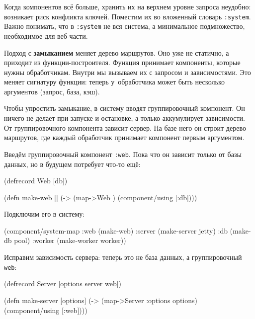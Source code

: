 Когда компонентов всё больше, хранить их на верхнем уровне запроса неудобно:
возникает риск конфликта ключей. Поместим их во вложенный словарь
\verb|:system|. Важно понимать, что в \verb|:system| не вся система, а
минимальное подмножество, необходимое для веб-части.


Подход с \textbf{замыканием} меняет дерево маршрутов. Оно уже не статично, а
приходит из функции-построителя. Функция принимает компоненты, которые нужны
обработчикам. Внутри мы вызываем их с запросом и зависимостями. Это меняет
сигнатуру функции: теперь у~обработчика может быть несколько аргументов (запрос,
база, кэш).

Чтобы упростить замыкание, в систему вводят группировочный компонент. Он ничего
не делает при запуске и остановке, а только аккумулирует зависимости. От
группировочного компонента зависит сервер. На базе него он строит дерево
маршрутов, где каждый обработчик принимает компонент первым аргументом.

Введём группировочный компонент \verb|:web|. Пока что он зависит только от
базы данных, но в будущем потребует что-то ещё:

\begin{english}
  \begin{clojure}
(defrecord Web [db])

(defn make-web []
  (-> (map->Web {})
      (component/using [:db])))
  \end{clojure}
\end{english}

\noindent
Подключим его в систему:

\begin{english}
  \begin{clojure}
(component/system-map
 :web    (make-web)
 :server (make-server jetty)
 :db     (make-db pool)
 :worker (make-worker worker))
  \end{clojure}
\end{english}


Исправим зависимость сервера: теперь это не база данных, а группировочный
\verb|web|:

\begin{english}
  \begin{clojure}
(defrecord Server
  [options server web])

(defn make-server [options]
  (-> (map->Server {:options options})
      (component/using [:web])))
  \end{clojure}
\end{english}

